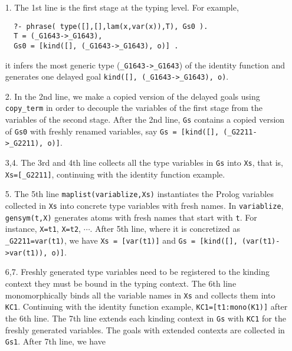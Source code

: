 \documentclass[runningheads,a4paper]{llncs}
\begin{document}
\begin{itemize}
\item[1.]
The 1st line is the first stage at the typing level.
For example, {\small \vspace*{-1.1ex}
\begin{verbatim}
  ?- phrase( type([],[],lam(x,var(x)),T), Gs0 ).
  T = (_G1643->_G1643),
  Gs0 = [kind([], (_G1643->_G1643), o)] .
\end{verbatim} \vspace*{-1.1ex} }
it infers the most generic type ({\small\verb|_G1643->_G1643|})
of the identity function and generates one delayed goal
{\;\small\verb|kind([], (_G1643->_G1643), o)|}.
\item[2.]
In the 2nd line, we make a copied version of
the delayed goals using {\small\verb|copy_term|} in order to decouple
the variables of the first stage from the variables of the second stage.
After the 2nd line, {\small\verb|Gs|} contains a copied version of
{\small\verb|Gs0|} with freshly renamed variables, say
{\small\verb|Gs = [kind([], (_G2211->_G2211), o)]|}.
\item[3,4.]
The 3rd and 4th line collects all the type variables
in {\small\verb|Gs|} into {\small\verb|Xs|}, that is,
{\small\verb|Xs=[_G2211]|}, continuing with the identity function example.
\item[5.]
The 5th line {\small\verb|maplist(variablize,Xs)|} instantiates
the Prolog variables collected in {\small\verb|Xs|} into concrete
type variables with fresh names. In {\small\verb|variablize|},
{\small\verb|gensym(t,X)|} generates atoms with fresh names that start with
{\small\verb|t|}. For instance, {\small\verb|X=t1|}, {\small\verb|X=t2|},
$\cdots$. After 5th line, where it is concretized as
{\small\verb|_G2211=var(t1)|}, we have {\small\verb|Xs = [var(t1)]|} and
{\small\verb|Gs = [kind([], (var(t1)->var(t1)), o)]|}.
\item[6,7.] Freshly generated type variables need to be
registered to the kinding context they must be bound
in the typing context. The 6th line monomorphically binds 
all the variable names in {\small\verb|Xs|} and collects them
into {\small\verb|KC1|}. Continuing with the identity function example,
{\small\verb|KC1=[t1:mono(K1)]|} after the 6th line. The 7th line
extends each kinding context in {\small\verb|Gs|} with {\small\verb|KC1|}
for the freshly generated variables. The goals with extended contexts are
collected in {\small\verb|Gs1|}. After 7th line, we have 

\end{itemize}
\end{document}
